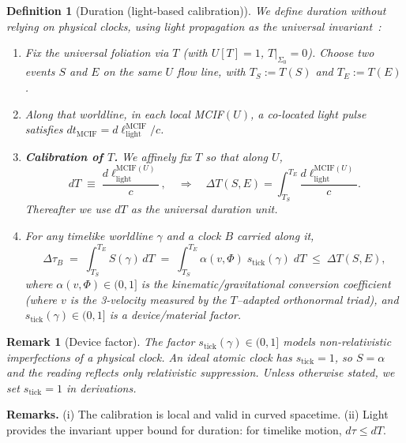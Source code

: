 \documentclass[12pt]{article}
\newtheorem{definition}{Definition}
\theoremstyle{plain} %
\newtheorem{remark}{Remark}
\newcommand{\stick}{s_{\mathrm{tick}}}
\begin{document}
\begin{definition}[Duration (light-based calibration)]
We define duration without relying on physical clocks, using light propagation as the universal invariant~\cite{Einstein1905,Rindler2006}:

\begin{enumerate}
    \item Fix the universal foliation via $T$ (with $U[T]=1$, $T|_{\Sigma_0}=0$). Choose two events $S$ and $E$ on the same $U$ flow line, with $T_S:=T(S)$ and $T_E:=T(E)$.
    \item Along that worldline, in each local MCIF$(U)$, a co-located light pulse satisfies $dt_{\mathrm{MCIF}} = d\ell_{\mathrm{light}}^{\mathrm{MCIF}}/c$.
    \item \textbf{Calibration of $T$.} We affinely fix $T$ so that along $U$,
    \begin{equation}
    dT \;\equiv\; \frac{d\ell_{\mathrm{light}}^{\mathrm{MCIF}(U)}}{c}\,,
    \quad\Rightarrow\quad
    \Delta T(S,E)=\int_{T_S}^{T_E}\frac{d\ell_{\mathrm{light}}^{\mathrm{MCIF}(U)}}{c}.
    \label{eq:calibration}
    \end{equation}
    Thereafter we use $dT$ as the universal duration unit.
    \item For any timelike worldline $\gamma$ and a clock $B$ carried along it,
    \begin{equation}
    \Delta\tau_B
    \;=\;
    \int_{T_S}^{T_E} S(\gamma)\, dT
    \;=\;
    \int_{T_S}^{T_E} \alpha(v,\Phi)\; \stick(\gamma)\; dT
    \;\le\; \Delta T(S,E),
    \label{eq:duration}
    \end{equation}
    where $\alpha(v,\Phi)\in(0,1]$ is the kinematic/gravitational conversion coefficient (where $v$ is the 3-velocity measured by the $T$–adapted orthonormal triad), and $\stick(\gamma)\in(0,1]$ is a device/material factor.
\end{enumerate}
\end{definition}

\begin{remark}[Device factor]
The factor $\stick(\gamma)\in(0,1]$ models non-relativistic imperfections of a physical clock. An \emph{ideal} atomic clock has $s_{\mathrm{tick}}=1$, so $S=\alpha$ and the reading reflects only relativistic suppression. Unless otherwise stated, we set $s_{\mathrm{tick}}=1$ in derivations.
\end{remark}

\noindent\textbf{Remarks.}
(i) The calibration is local and valid in curved spacetime.
(ii) Light provides the invariant upper bound for duration: for timelike motion, $d\tau\le dT$.
\end{document}
